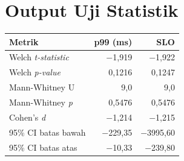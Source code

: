 \section*{Output Uji Statistik}

\begin{table}[htbp]
    \centering
    \begin{tabular}{lrr}
        \toprule
        Metrik & p99 (ms) & SLO \\
        \midrule
        Welch \emph{t-statistic} & $-$1,919 & $-$1,922 \\
        Welch \emph{p-value} & 0,1216 & 0,1247 \\
        Mann-Whitney U & 9,0 & 9,0 \\
        Mann-Whitney \emph{p} & 0,5476 & 0,5476 \\
        Cohen's \emph{d} & $-$1,214 & $-$1,215 \\
        95\% CI batas bawah & $-$229,35 & $-$3995,60 \\
        95\% CI batas atas & $-$10,33 & $-$239,80 \\
        \bottomrule
    \end{tabular}
\end{table}
